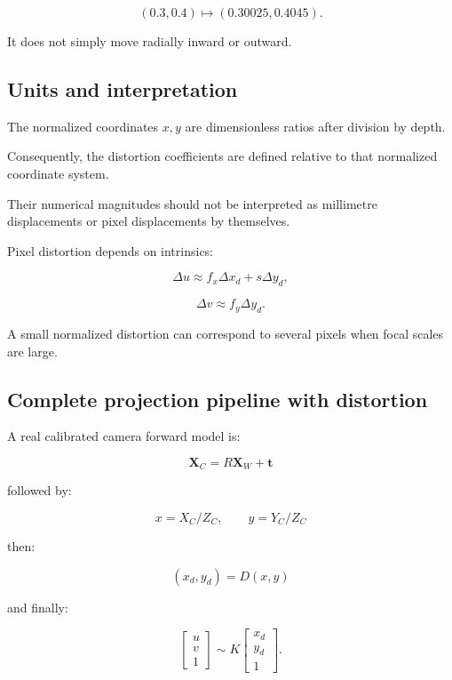 \[
 (0.3,0.4)\mapsto(0.30025,0.4045).
\]

It does not simply move radially inward or outward.

\subsection{Units and interpretation}\label{02-foundations-ii-ch035-units-and-interpretation}

\hypertarget{02-foundations-ii-ch035-units-and-interpretation}{}

The normalized coordinates \(x,y\) are dimensionless ratios after division by depth.

Consequently, the distortion coefficients are defined relative to that normalized coordinate system.

Their numerical magnitudes should not be interpreted as millimetre displacements or pixel displacements by themselves.

Pixel distortion depends on intrinsics:

\[
 \Delta u\approx f_x\Delta x_d+s\Delta y_d,
\]

\[
 \Delta v\approx f_y\Delta y_d.
\]

A small normalized distortion can correspond to several pixels when focal scales are large.

\subsection{Complete projection pipeline with distortion}\label{02-foundations-ii-ch035-complete-projection-pipeline-with-distortion}

\hypertarget{02-foundations-ii-ch035-complete-projection-pipeline-with-distortion}{}

A real calibrated camera forward model is:

\[
 \boxed{ \mathbf X_C=R\mathbf X_W+\mathbf t }
\]

followed by:

\[
 \boxed{ x=X_C/Z_C,\qquad y=Y_C/Z_C }
\]

then:

\[
 \boxed{ (x_d,y_d)=D(x,y) }
\]

and finally:

\[
 \boxed{ \begin{bmatrix}u\\v\\1\end{bmatrix} \sim K \begin{bmatrix}x_d\\y_d\\1\end{bmatrix} }.
\]

